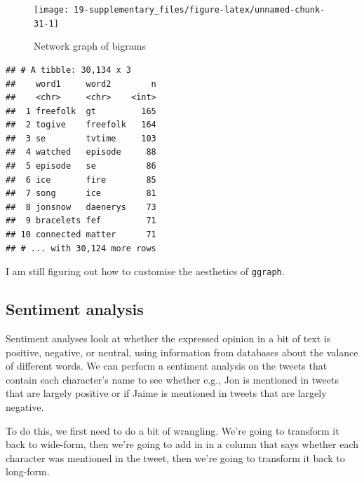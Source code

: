 \documentclass[]{book}
\begin{document}
\begin{figure}

{\centering \texttt{[image: 19-supplementary\_files/figure-latex/unnamed-chunk-31-1]} 

}

\caption{Network graph of bigrams}\label{fig:unnamed-chunk-31}
\end{figure}

\begin{verbatim}
## # A tibble: 30,134 x 3
##    word1     word2        n
##    <chr>     <chr>    <int>
##  1 freefolk  gt         165
##  2 togive    freefolk   164
##  3 se        tvtime     103
##  4 watched   episode     88
##  5 episode   se          86
##  6 ice       fire        85
##  7 song      ice         81
##  8 jonsnow   daenerys    73
##  9 bracelets fef         71
## 10 connected matter      71
## # ... with 30,124 more rows
\end{verbatim}

I am still figuring out how to customise the aesthetics of \texttt{ggraph}.

\hypertarget{sentiment-analysis}{%
\subsection{Sentiment analysis}\label{sentiment-analysis}}

Sentiment analyses look at whether the expressed opinion in a bit of text is positive, negative, or neutral, using information from databases about the valance of different words. We can perform a sentiment analysis on the tweets that contain each character's name to see whether e.g., Jon is mentioned in tweets that are largely positive or if Jaime is mentioned in tweets that are largely negative.

To do this, we first need to do a bit of wrangling. We're going to transform it back to wide-form, then we're going to add in in a column that says whether each character was mentioned in the tweet, then we're going to transform it back to long-form.
\end{document}
